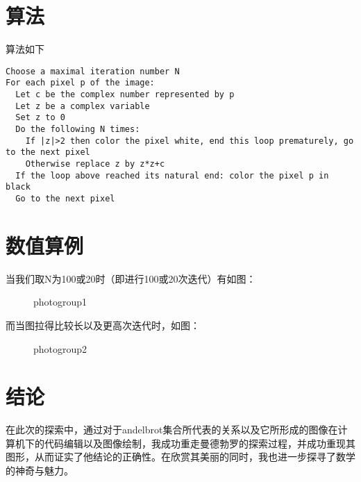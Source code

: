 \documentclass{ctexart}
\begin{document}
\section{算法}
算法\cite{Mandelbrot_set}如下
\begin{verbatim}
Choose a maximal iteration number N
For each pixel p of the image:
  Let c be the complex number represented by p
  Let z be a complex variable
  Set z to 0
  Do the following N times:    
    If |z|>2 then color the pixel white, end this loop prematurely, go to the next pixel
    Otherwise replace z by z*z+c
  If the loop above reached its natural end: color the pixel p in black
  Go to the next pixel
\end{verbatim}


\section{数值算例}


当我们取N为100或20时（即进行100或20次迭代）\cite{mathsoft04}有如图：\\

\begin{figure}[htbp]
\centering
{}
\caption{photogroup1}
\end{figure}

而当图拉得比较长以及更高次迭代时，如图：
\begin{figure}[htbp]
\centering
{}
\caption{photogroup2}
\end{figure}




\section{结论}

在此次的探索中，通过对于andelbrot集合所代表的关系以及它所形成的图像在计算机下的代码编辑以及图像绘制，我成功重走曼德勃罗的探索过程，并成功重现其图形，从而证实了他结论的正确性。在欣赏其美丽的同时，我也进一步探寻了数学的神奇与魅力。



\end{document}
